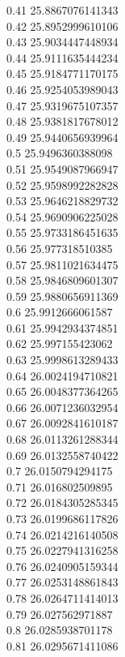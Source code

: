 {0.41	25.8867076141343\\
0.42	25.8952999610106\\
0.43	25.9034447448934\\
0.44	25.9111635444234\\
0.45	25.9184771170175\\
0.46	25.9254053989043\\
0.47	25.9319675107357\\
0.48	25.9381817678012\\
0.49	25.9440656939964\\
0.5	25.9496360388098\\
0.51	25.9549087966947\\
0.52	25.9598992282828\\
0.53	25.9646218829732\\
0.54	25.9690906225028\\
0.55	25.9733186451635\\
0.56	25.977318510385\\
0.57	25.9811021634475\\
0.58	25.9846809601307\\
0.59	25.9880656911369\\
0.6	25.9912666061587\\
0.61	25.9942934374851\\
0.62	25.997155423062\\
0.63	25.9998613289433\\
0.64	26.0024194710821\\
0.65	26.0048377364265\\
0.66	26.0071236032954\\
0.67	26.0092841610187\\
0.68	26.0113261288344\\
0.69	26.0132558740422\\
0.7	26.0150794294175\\
0.71	26.016802509895\\
0.72	26.0184305285345\\
0.73	26.0199686117826\\
0.74	26.0214216140508\\
0.75	26.0227941316258\\
0.76	26.0240905159344\\
0.77	26.0253148861843\\
0.78	26.0264711414013\\
0.79	26.027562971887\\
0.8	26.0285938701178\\
0.81	26.0295671411086\\
}
